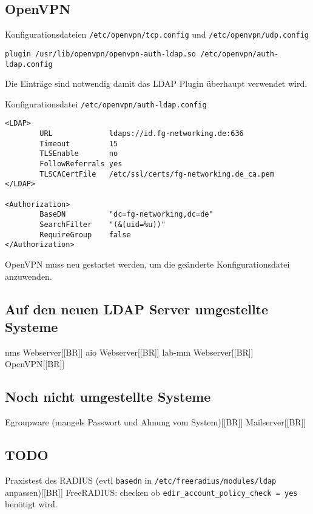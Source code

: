 \documentclass[11pt,a4paper,titlepage=firstiscover]{scrartcl} %
\begin{document}
\subsection{OpenVPN}
Konfigurationsdateien \texttt{/etc/openvpn/tcp.config} und \texttt{/etc/openvpn/udp.config}
\begin{lstlisting}
plugin /usr/lib/openvpn/openvpn-auth-ldap.so /etc/openvpn/auth-ldap.config
\end{lstlisting}
Die Einträge sind notwendig damit das LDAP Plugin überhaupt verwendet wird.

Konfigurationsdatei \texttt{/etc/openvpn/auth-ldap.config}
\begin{lstlisting}
<LDAP>
        URL             ldaps://id.fg-networking.de:636
        Timeout         15
        TLSEnable       no
        FollowReferrals yes
        TLSCACertFile   /etc/ssl/certs/fg-networking.de_ca.pem
</LDAP>

<Authorization>
        BaseDN          "dc=fg-networking,dc=de"
        SearchFilter    "(&(uid=%u))"
        RequireGroup    false
</Authorization>
\end{lstlisting}
OpenVPN muss neu gestartet werden, um die geänderte Konfigurationsdatei anzuwenden.


\subsection{Auf den neuen LDAP Server umgestellte Systeme}
nms Webserver[[BR]]
aio Webserver[[BR]]
lab-mm Webserver[[BR]]
OpenVPN[[BR]]


\subsection{Noch nicht umgestellte Systeme}
Egroupware (mangels Passwort und Ahnung vom System)[[BR]]
Mailserver[[BR]]


\subsection{TODO}
Praxistest des RADIUS (evtl \texttt{basedn} in \texttt{/etc/freeradius/modules/ldap} anpassen)[[BR]]
FreeRADIUS: checken ob \texttt{edir_account_policy_check = yes} benötigt wird.
\end{document}
